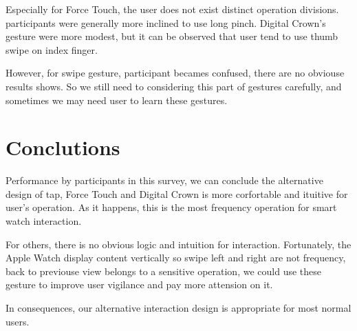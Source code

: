 Especially for Force Touch, the user does not exist distinct operation divisions. participants were generally more inclined to use long pinch. Digital Crown's gesture were more modest, but it can be observed that user tend to use thumb swipe on index finger.

However, for swipe gesture, participant becames confused, there are no obviouse results shows. So we still need to considering this part of gestures carefully, and sometimes we may need user to learn these gestures.

\section{Conclutions}

Performance by participants in this survey, we can conclude the alternative design of tap, Force Touch and Digital Crown is more corfortable and ituitive for user's operation. As it happens, this is the most frequency operation for smart watch interaction.

For others, there is no obvious logic and intuition for interaction. Fortunately, the Apple Watch display content vertically so swipe left and right are not frequency, back to previouse view belongs to a sensitive operation, we could use these gesture to improve user vigilance and pay more attension on it.

In consequences, our alternative interaction design is appropriate for most normal users.

\cleardoublepage
